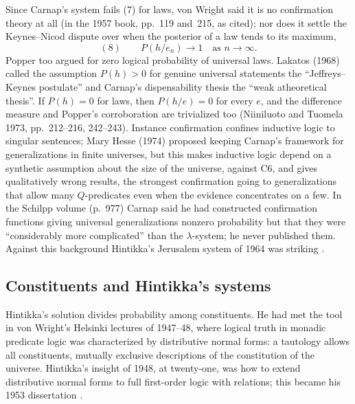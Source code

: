 Since Carnap's system fails (7) for laws, von Wright said it is no
confirmation theory at all (in the 1957 book, pp.~119 and~215, as
cited); nor does
it settle the Keynes--Nicod dispute over when the posterior of a law
tends to its maximum,
\[
 (8)\qquad P(h/e_n)\to1\quad\text{as }n\to\infty.
\]
Popper too argued for zero logical probability of universal laws.
Lakatos (1968) called the assumption \(P(h)>0\) for genuine universal
statements the ``Jeffreys--Keynes postulate'' and Carnap's dispensability
thesis the ``weak atheoretical thesis''. If \(P(h)=0\) for laws, then
\(P(h/e)=0\) for every \(e\), and the difference measure and Popper's
corroboration are trivialized too (Niiniluoto and Tuomela 1973,
pp.~212--216, 242--243). Instance confirmation confines
inductive logic to singular sentences; Mary Hesse (1974) proposed keeping
Carnap's framework for generalizations in finite universes, but this
makes inductive logic depend on a synthetic assumption about the size of
the universe, against C6, and gives qualitatively wrong results, the
strongest confirmation going to generalizations that allow many
\(Q\)-predicates even when the evidence concentrates on a few. In the
Schilpp volume (p.~977) Carnap said he had constructed confirmation
functions giving universal generalizations nonzero probability but that
they were ``considerably more complicated'' than the \(\lambda\)-system;
he never published them. Against this background Hintikka's Jerusalem
system of 1964 was striking \cite[pp.~317--318]{Niiniluoto2011HintikkaProgramReading}.

\subsection{Constituents and Hintikka's systems}
\label{sec:p15-w02b-p15-030-nn-constituents}

Hintikka's solution divides probability among constituents. He had met
the tool in von Wright's Helsinki lectures of 1947--48, where logical
truth in monadic predicate logic was characterized by distributive
normal forms: a tautology allows all constituents, mutually exclusive
descriptions of the constitution of the universe. Hintikka's insight of
1948, at twenty-one, was how to extend distributive normal forms to full
first-order logic with relations; this became his 1953 dissertation
\cite[p.~318]{Niiniluoto2011HintikkaProgramReading}.


